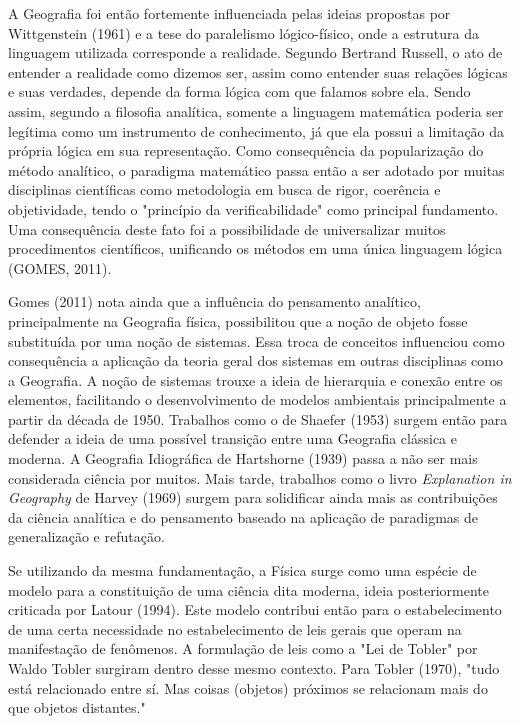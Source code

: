 A Geografia foi então fortemente influenciada pelas ideias propostas por Wittgenstein (1961) e a tese do paralelismo lógico-físico, onde a estrutura da linguagem utilizada corresponde a realidade. Segundo Bertrand Russell, o ato de entender a realidade como dizemos ser, assim como entender suas relações lógicas e suas verdades, depende da forma lógica com que falamos sobre ela. Sendo assim, segundo a filosofia analítica, somente a linguagem matemática poderia ser legítima como um instrumento de conhecimento, já que ela possui a limitação da própria lógica em sua representação. Como consequência da popularização do método analítico, o paradigma matemático passa então a ser adotado por muitas disciplinas científicas como metodologia em busca de rigor, coerência e objetividade, tendo o "princípio da verificabilidade" como principal fundamento. Uma consequência deste fato foi a possibilidade de universalizar muitos procedimentos científicos, unificando os métodos em uma única linguagem lógica (GOMES, 2011).

Gomes (2011) nota ainda que a influência do pensamento analítico, principalmente na Geografia física, possibilitou que a noção de objeto fosse substituída por uma noção de sistemas. Essa troca de conceitos influenciou como consequência a aplicação da teoria geral dos sistemas em outras disciplinas como a Geografia. A noção de sistemas trouxe a ideia de hierarquia e conexão entre os elementos, facilitando o desenvolvimento de modelos ambientais principalmente a partir da década de 1950. Trabalhos como o de Shaefer (1953) surgem então para defender a ideia de uma possível transição entre uma Geografia clássica e moderna. A Geografia Idiográfica de Hartshorne (1939) passa a não ser mais considerada ciência por muitos. Mais tarde, trabalhos como o livro \textit{Explanation in Geography} de Harvey (1969) surgem para solidificar ainda mais as contribuições da ciência analítica e do pensamento baseado na aplicação de paradigmas de generalização e refutação.

Se utilizando da mesma fundamentação, a Física surge como uma espécie de modelo para a constituição de uma ciência dita moderna, ideia posteriormente criticada por Latour (1994). Este modelo contribui então para o estabelecimento de uma certa necessidade no estabelecimento de leis gerais que operam na manifestação de fenômenos. A formulação de leis como a "Lei de Tobler" por Waldo Tobler surgiram dentro desse mesmo contexto. Para Tobler (1970), "tudo está relacionado entre sí. Mas coisas (objetos) próximos se relacionam mais do que objetos distantes."

